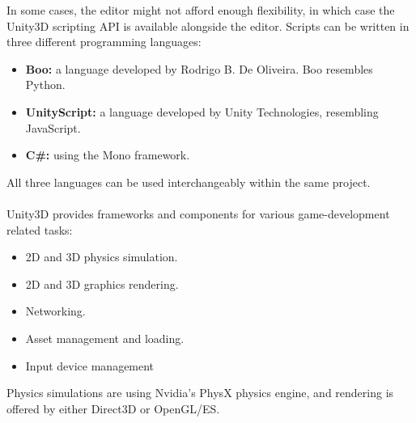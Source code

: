 In some cases, the editor might not afford enough flexibility, in which case
the Unity3D scripting API is available alongside the editor.
Scripts can be written in three different programming languages:

\begin{itemize}
    \item \textbf{Boo:} a language developed by Rodrigo B. De Oliveira. Boo resembles Python.
    \item \textbf{UnityScript:} a language developed by Unity
        Technologies, resembling JavaScript.
    \item \textbf{C\#:} using the Mono framework.
\end{itemize}

All three languages can be used interchangeably within the same project.
\\
\\
Unity3D provides frameworks and components for various game-development related
tasks:
\begin{itemize}
    \item 2D and 3D physics simulation.
    \item 2D and 3D graphics rendering.
    \item Networking.
    \item Asset management and loading.
    \item Input device management
\end{itemize}

Physics simulations are using Nvidia's PhysX physics engine, and rendering is
offered by either Direct3D or OpenGL/ES.


